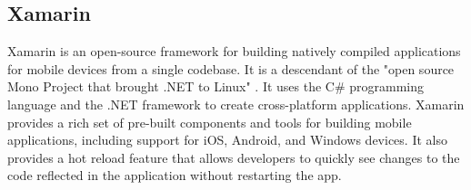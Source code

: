 \subsection{Xamarin}
Xamarin is an open-source framework for building natively compiled applications for mobile devices from a single codebase.
It is a descendant of the "open source Mono Project that brought .NET to Linux" \cite{xamarinQ}.
It uses the C\# programming language and the .NET framework to create cross-platform applications.
Xamarin provides a rich set of pre-built components and tools for building mobile applications, including support for iOS, Android, and Windows devices.
It also provides a hot reload feature that allows developers to quickly see changes to the code reflected in the application without restarting the app.


\label{chap:ch4}
